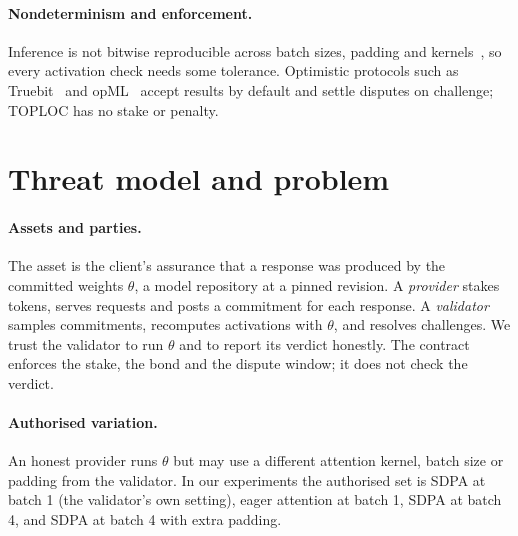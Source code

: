 \documentclass[11pt]{article}
\begin{document}
\paragraph{Nondeterminism and enforcement.}
Inference is not bitwise reproducible across batch sizes, padding and kernels~\cite{he2025nondeterminism}, so every activation check needs some tolerance.
Optimistic protocols such as Truebit~\cite{teutsch2019truebit} and opML~\cite{conway2024opml} accept results by default and settle disputes on challenge; TOPLOC has no stake or penalty.

\section{Threat model and problem}
\label{sec:threat}

\paragraph{Assets and parties.}
The asset is the client's assurance that a response was produced by the committed weights $\theta$, a model repository at a pinned revision.
A \emph{provider} stakes tokens, serves requests and posts a commitment for each response.
A \emph{validator} samples commitments, recomputes activations with $\theta$, and resolves challenges.
We trust the validator to run $\theta$ and to report its verdict honestly.
The contract enforces the stake, the bond and the dispute window; it does not check the verdict.

\paragraph{Authorised variation.}
An honest provider runs $\theta$ but may use a different attention kernel, batch size or padding from the validator.
In our experiments the authorised set is SDPA at batch 1 (the validator's own setting), eager attention at batch 1, SDPA at batch 4, and SDPA at batch 4 with extra padding.
\end{document}
